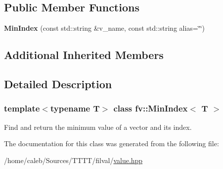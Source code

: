 \subsection*{Public Member Functions}
\begin{DoxyCompactItemize}
\item 
\hypertarget{classfv_1_1MinIndex_afa1e4b9d2c35689b082c222ee1bfdfe8}{}\label{classfv_1_1MinIndex_afa1e4b9d2c35689b082c222ee1bfdfe8} 
{\bfseries Min\+Index} (const std\+::string \&v\+\_\+name, const std\+::string alias=\char`\"{}\char`\"{})
\end{DoxyCompactItemize}
\subsection*{Additional Inherited Members}


\subsection{Detailed Description}
\subsubsection*{template$<$typename T$>$\newline
class fv\+::\+Min\+Index$<$ T $>$}

Find and return the minimum value of a vector and its index. 

The documentation for this class was generated from the following file\+:\begin{DoxyCompactItemize}
\item 
/home/caleb/\+Sources/\+T\+T\+T\+T/filval/\hyperlink{value_8hpp}{value.\+hpp}\end{DoxyCompactItemize}
